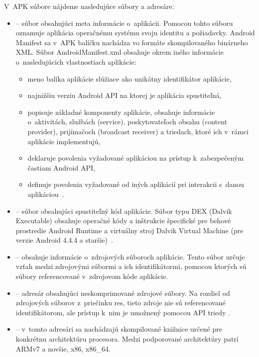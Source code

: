 V~APK súbore nájdeme nasledujúce súbory a adresáre:
\begin{itemize}

	\item {} -- súbor obsahujúci meta informácie o~aplikácii. Pomocou tohto súboru oznamuje aplikácia operačnému systému svoju identitu a požiadavky. Android Manifest sa v~APK balíčku nachádza vo formáte skompilovaného binárneho XML.
Súbor AndroidManifest.xml obsahuje okrem iného informácie o~nasledujúcich vlastnostiach aplikácie:
		
		\begin{itemize}
			\item meno balíka aplikácie slúžiace ako unikátny identifikátor aplikácie,
			\item najnižšiu verziu Android API na ktorej je aplikácia spustiteľná,
			\item popisuje základné komponenty aplikácie, obsahuje informácie o~aktivitách, službách (service), poskytovateľoch obsahu (content provider), prijímačoch (broadcast receiver) a triedach, ktoré ich v~rámci aplikácie implementujú,
			\item deklaruje povolenia vyžadované aplikáciou na prístup k~zabezpečeným častiam Android API,
			\item definuje povolenia vyžadované od iných aplikácií pri interakcii s~danou aplikáciou~\cite{Manifest}.
		\end{itemize}
	
	\item {} -- súbor obsahujúci spustiteľný kód aplikácie. Súbor typu DEX (Dalvik Executable) obsahuje operačné kódy a inštrukcie špecifické pre behové prostredie Android Runtime a virtuálny stroj Dalvik Virtual Machine (pre verzie Android 4.4.4 a staršie)~\cite{DexFormat}. 

	\item {} -- obsahuje informácie o~zdrojových súboroch aplikácie. Tento súbor určuje vzťah medzi zdrojovými súbormi a ich identifikátormi, pomocou ktorých sú súbory referencované v~zdrojovom kóde aplikácie.
	
	\item {} -- adresár obsahujúci neskomprimované zdrojové súbory.  Na rozdiel od zdrojových súborov z~priečinku res, tieto zdroje nie sú referencované identifikátorom, ale prístup k~nim je umožnený pomocou API triedy .
	
	\item {} -- v~tomto adresári sa nachádzajú skompilované knižnice určené pre konkrétnu architektúru procesora. Medzi podporované architektúry patrí ARMv7 a novšie, x86, x86\_64.


\end{itemize}
